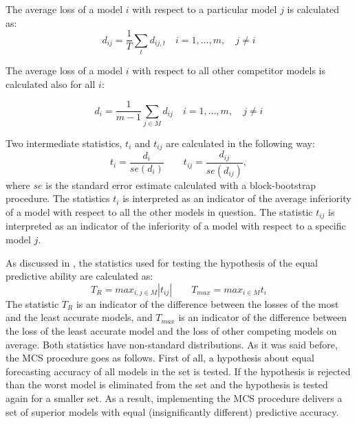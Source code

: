 \documentclass[11pt]{article} %
\begin{document}
The average loss of a model $i$ with respect to a particular model $j$ is calculated as:
 \begin{equation}
d_{ij}=\frac{1}{T}\sum_{t} d_{ij,t}\quad i=1,\ldots ,m,\quad j\ne i
\end{equation}

The average loss of a model $i$ with respect to all other competitor models is calculated also for all $i$:

\begin{equation}
d_i=\frac{1}{m-1}\sum_{j\in M} d_{ij}\quad i=1,\ldots ,m,\quad j\ne i
\end{equation}


Two intermediate statistics, $t_{i}$ and  $t_{ij}$ are calculated in the following way:
\begin{equation}
t_i = \frac{d_i}{se(d_i)}\qquad t_{ij}=\frac{d_{ij}}{se(d_{ij})},
\end{equation}
where $se$ is the standard error estimate calculated with a block-bootstrap procedure. The statistics $t_i$ is interpreted as an indicator of the average inferiority of a model with respect to all the other models in question.  The statistic $t_{ij}$ is interpreted as an indicator of the inferiority of a model with respect to a specific model $j$.

As discussed in \cite{hansen_al_2011}, the statistics used for testing the hypothesis of the equal predictive ability are calculated as:
\begin{equation}
T_{R} = max_{i,j\in M}|t_{ij}|\qquad T_{max}=max_{i\in M} t_i
\end{equation}
The statistic $T_{R}$ is an indicator of the difference between the losses of the most and the least accurate models, and $T_{max}$ is an indicator of the difference between the loss of the least accurate model and the loss  of other competing models on average.
Both statistics have non-standard distributions.
As it was said before, the MCS procedure goes as follows. First of all, a hypothesis about equal forecasting accuracy of all models in the set is tested. If the hypothesis is rejected than the worst model is eliminated from the set and the hypothesis is tested again for a smaller set.
As a result, implementing the MCS procedure delivers a set of superior models with equal (insignificantly different) predictive accuracy.
\end{document}
